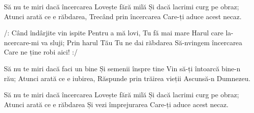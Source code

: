 \beginverse
Să nu te miri dacă încercarea
Lovește fără milă
Și dacă lacrimi curg pe obraz;
Atunci arată ce e răbdarea,
Trecând prin încercarea
Care-ți aduce acest necaz.
\endverse

\beginchorus
/: Când îndârjite vin ispite
Pentru a mă lovi,
Tu fă mai mare
Harul care la-ncercare-mi va sluji;
Prin harul Tău Tu ne dai răbdarea
Să-nvingem încercarea
Care ne ține robi aici! :/
\endchorus

\beginverse
Să nu te miri dacă faci un bine
Și semenii înspre tine
Vin să-ți întoarcă bine-n rău;
Atunci arată ce e iubirea,
Răspunde prin trăirea vieții
Ascunsă-n Dumnezeu.
\endverse

\beginverse
Să nu te miri dacă încercarea
Lovește fără milă
Și dacă lacrimi curg pe obraz;
Atunci arată ce e răbdarea
Și vezi împrejurarea
Care-ți aduce acest necaz.
\endverse
\endsong